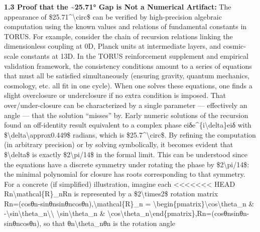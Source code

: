 \documentclass[]{article}
\begin{document}
\textbf{1.3 Proof that the \textasciitilde{}25.71° Gap is Not a
Numerical Artifact:} The appearance of \$25.71\^{}\textbackslash{}circ\$
can be verified by high-precision algebraic computation using the known
values and relations of fundamental constants in TORUS. For example,
consider the chain of recursion relations linking the dimensionless
coupling at 0D, Planck units at intermediate layers, and cosmic-scale
constants at 13D. In the TORUS reinforcement supplement and empirical
validation framework, the consistency conditions amount to a series of
equations that must all be satisfied simultaneously (ensuring gravity,
quantum mechanics, cosmology, etc. all fit in one cycle)​. When one
solves these equations, one finds a slight overclosure or underclosure
if no extra condition is imposed. That over/under-closure can be
characterized by a single parameter --- effectively an angle --- that
the solution ``misses'' by. Early numeric solutions of the recursion
found an off-identity result equivalent to a complex phase
eiδe\^{}\{i\textbackslash{}delta\}eiδ with
\$\textbackslash{}delta\textbackslash{}approx0.449\$ radians, which is
\$25.7\^{}\textbackslash{}circ\$. By refining the computation (in
arbitrary precision) or by solving symbolically, it becomes evident that
\$\textbackslash{}delta\$ is exactly \$2\textbackslash{}pi/14\$ in the
formal limit. This can be understood since the equations have a discrete
symmetry under rotating the phase by \$2\textbackslash{}pi/14\$: the
minimal polynomial for closure has roots corresponding to that symmetry.
For a concrete (if simplified) illustration, imagine each
<<<<<<< HEAD
Rn\textbackslash mathcal\{R\}\_nRn\hspace{0pt} is represented by a
\$2\textbackslash times2\$ rotation matrix\\
Rn=(cos⁡θn-sin⁡θnsin⁡θncos⁡θn),\textbackslash mathcal\{R\}\_n =
\textbackslash begin\{pmatrix\}\textbackslash cos\textbackslash theta\_n
\&
-\textbackslash sin\textbackslash theta\_n\textbackslash\textbackslash{}
\textbackslash sin\textbackslash theta\_n \&
\textbackslash cos\textbackslash theta\_n\textbackslash end\{pmatrix\},Rn\hspace{0pt}=(cosθn\hspace{0pt}sinθn\hspace{0pt}\hspace{0pt}-sinθn\hspace{0pt}cosθn\hspace{0pt}\hspace{0pt}),
so that θn\textbackslash theta\_nθn\hspace{0pt} is the rotation angle
\end{document}
